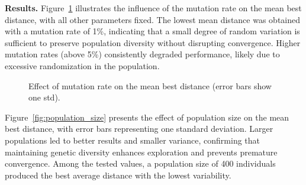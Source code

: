 \documentclass{scrartcl}
\begin{document}
\vspace{0.3cm}
\noindent\textbf{Results.}  
Figure~\ref{fig:mutation_rate} illustrates the influence of the mutation rate on the mean best distance, with all other parameters fixed.  
The lowest mean distance was obtained with a mutation rate of 1\%, indicating that a small degree of random variation is sufficient to preserve population diversity without disrupting convergence.  
Higher mutation rates (above 5\%) consistently degraded performance, likely due to excessive randomization in the population.



\begin{figure}[H] 
  \centering

  \caption{Effect of mutation rate on the mean best distance (error bars show one std).}
  \label{fig:mutation_rate}
\end{figure}






Figure~\ref{fig:population_size} presents the effect of population size on the mean best distance, with error bars representing one standard deviation.  
Larger populations led to better results and smaller variance, confirming that maintaining genetic diversity enhances exploration and prevents premature convergence.  
Among the tested values, a population size of 400 individuals produced the best average distance with the lowest variability.
\end{document}
